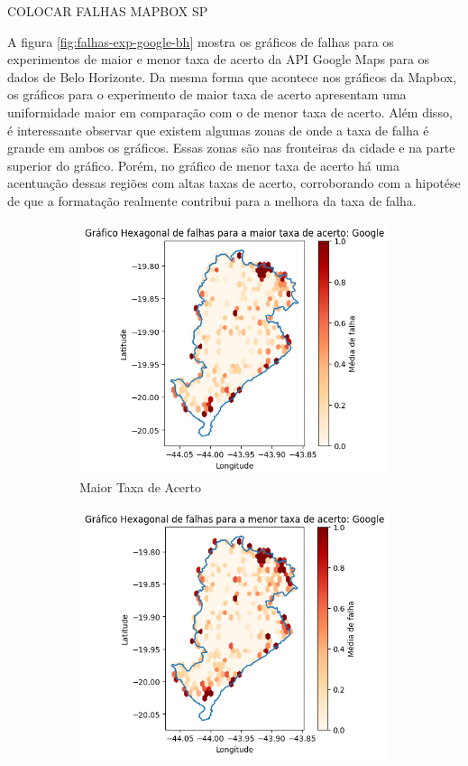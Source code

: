 COLOCAR FALHAS MAPBOX SP

A figura \ref{fig:falhas-exp-google-bh} mostra os gráficos de falhas para os experimentos de maior e menor taxa de acerto da API Google Maps para os dados de Belo Horizonte. Da mesma forma que acontece nos gráficos da Mapbox, os gráficos para o experimento de maior taxa de acerto apresentam uma uniformidade maior em comparação com o de menor taxa de acerto. Além disso, é interessante observar que existem algumas zonas de onde a taxa de falha é grande em ambos os gráficos. Essas zonas são nas fronteiras da cidade e na parte superior do gráfico. Porém, no gráfico de menor taxa de acerto há uma acentuação dessas regiões com altas taxas de acerto, corroborando com a hipotése de que a formatação realmente contribui para a melhora da taxa de falha. 

\begin{figure}[ht]
  \centering
  \begin{subfigure}[b]{0.45\textwidth}
    \includegraphics[width=\textwidth]{Figuras/expFalhasGooglemaior.png}
    \caption{Maior Taxa de Acerto}
    \label{fig:falhasgoogleBHexpMaior}
  \end{subfigure}
  \hfill
  \begin{subfigure}[b]{0.45\textwidth}
    \includegraphics[width=\textwidth]{Figuras/expFalhasGooglemenor.png}

\end{subfigure}
\end{figure}
